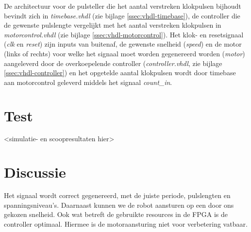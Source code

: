 \documentclass{report}
\begin{document}
De architectuur voor de pulsteller die het aantal verstreken klokpulsen bijhoudt bevindt zich in \textit{timebase.vhdl} (zie bijlage \ref{ssec:vhdl-timebase}), de controller die de gewenste pulslengte vergelijkt met het aantal verstreken klokpulsen in \textit{motorcontrol.vhdl} (zie bijlage \ref{ssec:vhdl-motorcontrol}). Het klok- en resetsignaal (\textit{clk} en \textit{reset}) zijn inputs van buitenaf, de gewenste snelheid (\textit{speed}) en de motor (links of rechts) voor welke het signaal moet worden gegenereerd worden (\textit{motor}) aangeleverd door de overkoepelende controller (\textit{controller.vhdl}, zie bijlage \ref{ssec:vhdl-controller}) en het opgetelde aantal klokpulsen wordt door timebase aan motorcontrol geleverd middels het signaal \textit{count\_in}.

\section{Test}
\label{sec:servo-test}

<simulatie- en scoopresultaten hier>

\section{Discussie}
\label{sec:servo-disc}

Het signaal wordt correct gegenereerd, met de juiste periode, pulslengten en spanningsniveau's. Daarnaast kunnen we de robot aansturen op een door ons gekozen snelheid. Ook wat betreft de gebruikte resources in de FPGA is de controller optimaal. Hiermee is de motoraansturing niet voor verbetering vatbaar.
\end{document}
